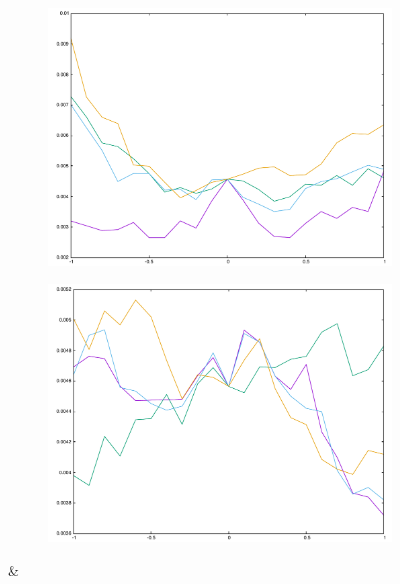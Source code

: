 {\begin{figure}[H]
\begin{subfigure}{.33\textwidth}
	\includegraphics[width=\linewidth]{fig/ajherr/t3tr/L_chi.pdf}
\end{subfigure}%
\begin{subfigure}{.33\textwidth}
	\includegraphics[width=\linewidth]{fig/ajherr/t3tr/M_chi.pdf}
\end{subfigure}&
\begin{subfigure}{.33\textwidth}

\end{subfigure}
\end{figure}}
